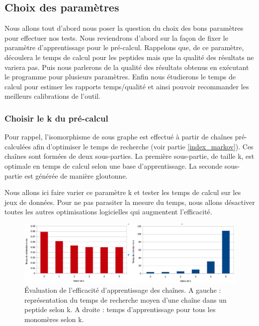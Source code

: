 \subsection{Choix des paramètres}

\label{parameters_choice}

Nous allons tout d'abord nous poser la question du choix des bons paramètres pour effectuer nos tests.
Nous reviendrons d'abord sur la façon de fixer le paramètre d'apprentissage pour le pré-calcul.
Rappelons que, de ce paramètre, découlera le temps de calcul pour les peptides mais que la qualité des résultats ne variera pas.
Puis nous parlerons de la qualité des résultats obtenus en exécutant le programme pour plusieurs paramètres.
Enfin nous étudierons le temps de calcul pour estimer les rapports temps/qualité et ainsi pouvoir recommander les meilleurs calibrations de l'outil.

\subsubsection{Choisir le k du pré-calcul}

Pour rappel, l'isomorphisme de sous graphe est effectué à partir de chaînes pré-calculées afin d'optimiser le temps de recherche (voir partie \ref{index_markov}).
Ces chaînes sont formées de deux sous-parties.
La première sous-partie, de taille k, est optimale en temps de calcul selon une base d'apprentissage.
La seconde sous-partie est générée de manière gloutonne.

Nous allons ici faire varier ce paramètre k et tester les temps de calcul sur les jeux de données.
Pour ne pas parasiter la mesure du temps, nous allons désactiver toutes les autres optimisations logicielles qui augmentent l'efficacité.

\begin{figure}[!ht]
  \begin{center}
    \includegraphics[width=450px]{Figures/s2m/results/k.png}
    \caption{\label{k_graph}Évaluation de l'efficacité d'apprentissage des chaînes.
    A gauche : représentation du temps de recherche moyen d'une chaîne dans un peptide selon k.
    A droite : temps d'apprentissage pour tous les monomères selon k.}
  \end{center}
\end{figure}

